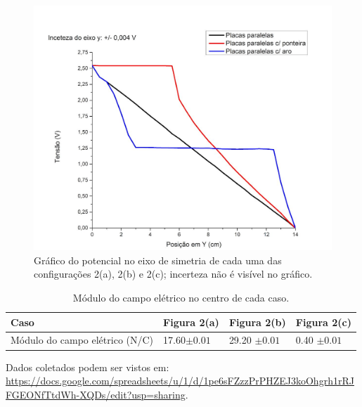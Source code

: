 \begin{figure}[ht!]
\centering
\includegraphics[width = 9 cm]{figuras/Graph6.png}
\caption{\small{Gráfico do potencial no eixo de simetria de cada uma das configurações 2(a), 2(b) e 2(c); incerteza não é visível no gráfico.}}
\label{fig:8}
\end{figure}

\begin{table}[ht!]
\center
\begin{tabular}{|l|l|l|l|}
\hline
Caso & Figura 2(a) & Figura 2(b) & Figura 2(c) \\ \hline
Módulo do campo elétrico (N/C) &17.60$\pm 0.01$     & 29.20  $\pm 0.01$     & 0.40 $\pm 0.01$
\\ \hline
\end{tabular}
\caption{Módulo do campo elétrico no centro de cada caso.}
\label{tab:1}
\end{table}

Dados coletados podem ser vistos em: \url{https://docs.google.com/spreadsheets/u/1/d/1pe6sFZzzPrPHZEJ3koOhgrh1rRJFGEONfTtdWh-XQDs/edit?usp=sharing}.

